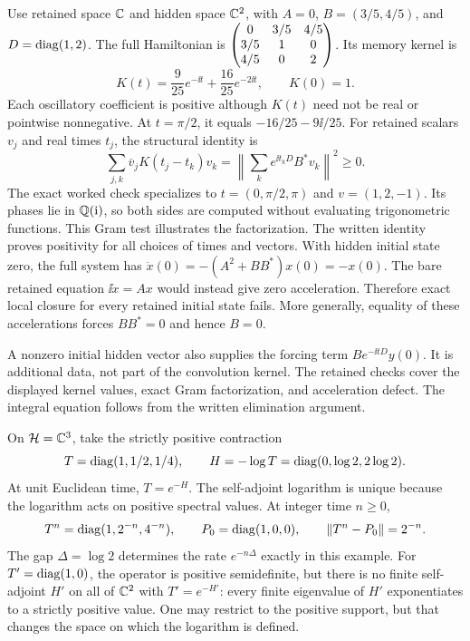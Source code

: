Use retained space $\mathbb C$ and hidden space $\mathbb C^2$, with $A=0$, $B=(3/5,4/5)$, and $D=\operatorname{diag}(1,2)$. The full Hamiltonian is $\begin{pmatrix}0&3/5&4/5\\3/5&1&0\\4/5&0&2\end{pmatrix}$. Its memory kernel is
\[
K(t)=\frac9{25}e^{-\ii t}+\frac{16}{25}e^{-2\ii t},
\qquad K(0)=1.
\]
Each oscillatory coefficient is positive although $K(t)$ need not be real or pointwise nonnegative. At $t=\pi/2$, it equals $-16/25-9\ii/25$.
For retained scalars $v_j$ and real times $t_j$, the structural identity is
\[
\sum_{j,k}\overline v_jK(t_j-t_k)v_k
=\left\|\sum_k e^{\ii t_kD}B^*v_k\right\|^2\geq0.
\]
The exact worked check specializes to $t=(0,\pi/2,\pi)$ and $v=(1,2,-1)$. Its phases lie in $\mathbb Q(\mathrm i)$, so both sides are computed without evaluating trigonometric functions. This Gram test illustrates the factorization. The written identity proves positivity for all choices of times and vectors.
With hidden initial state zero, the full system has $\ddot x(0)=-(A^2+BB^*)x(0)=-x(0)$. The bare retained equation $\ii\dot x=Ax$ would instead give zero acceleration. Therefore exact local closure for every retained initial state fails. More generally, equality of these accelerations forces $BB^*=0$ and hence $B=0$.

A nonzero initial hidden vector also supplies the forcing term $Be^{-\ii tD}y(0)$. It is additional data, not part of the convolution kernel. The retained checks cover the displayed kernel values, exact Gram factorization, and acceleration defect. The integral equation follows from the written elimination argument.

On $\mathcal H=\mathbb C^3$, take the strictly positive contraction
\[
T=\operatorname{diag}(1,1/2,1/4),\qquad H=-\log T=\operatorname{diag}(0,\log2,2\log2).
\]
At unit Euclidean time, $T=e^{-H}$. The self-adjoint logarithm is unique because the logarithm acts on positive spectral values. At integer time $n\geq0$,
\[
T^n=\operatorname{diag}(1,2^{-n},4^{-n}),\qquad
P_0=\operatorname{diag}(1,0,0),\qquad\left\lVert T^n-P_0\right\rVert=2^{-n}.
\]
The gap $\Delta=\log2$ determines the rate $e^{-n\Delta}$ exactly in this example.
For $T'=\operatorname{diag}(1,0)$, the operator is positive semidefinite, but there is no finite self-adjoint $H'$ on all of $\mathbb C^2$ with $T'=e^{-H'}$: every finite eigenvalue of $H'$ exponentiates to a strictly positive value. One may restrict to the positive support, but that changes the space on which the logarithm is defined.


